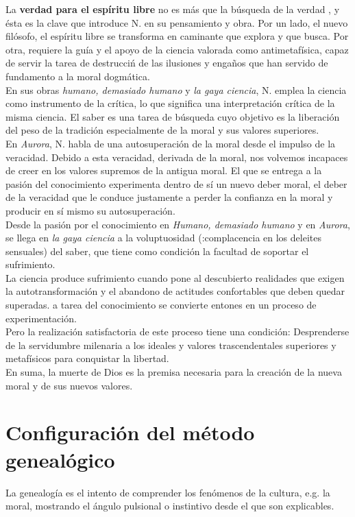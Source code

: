 \documentclass[a4paper, 10pt, twocolumn, spanish]{article}
\begin{document}
La \textbf{verdad para el espíritu libre} no es más que la búsqueda de la
verdad , y ésta es la clave que introduce N. en su pensamiento y
obra. Por un lado, el nuevo filósofo, el espíritu libre se transforma
en caminante que explora y que busca. Por otra, requiere la guía y el
apoyo de la ciencia valorada como antimetafísica, capaz de servir la
tarea de destrucciń de las ilusiones y engaños que han servido de
fundamento a la moral dogmática.\\[0pt]

En sus obras \emph{humano, demasiado humano} y \emph{la gaya ciencia}, N. emplea
la ciencia como instrumento de la crítica, lo que significa una
interpretación crítica de la misma ciencia. El saber es una tarea de
búsqueda cuyo objetivo es la liberación del peso de la tradición
especialmente de la moral y sus valores superiores.\\[0pt]

En \emph{Aurora}, N. habla de una autosuperación de la moral desde el
impulso de la veracidad. Debido a esta veracidad, derivada de la
moral, nos volvemos incapaces de creer en los valores supremos de la
antigua moral. El que se entrega a la pasión del conocimiento
experimenta dentro de sí un nuevo deber moral, el deber de la
veracidad que le conduce justamente a perder la confianza en la moral
y producir en sí mismo su autosuperación.\\[0pt]

Desde la pasión por el conocimiento en \emph{Humano, demasiado humano} y en
\emph{Aurora}, se llega en \emph{la gaya ciencia} a la voluptuosidad
(:complacencia en los deleites sensuales) del saber, que tiene como
condición la facultad de soportar el sufrimiento.\\[0pt]
La ciencia produce sufrimiento cuando pone al descubierto realidades
que exigen la autotransformación y el abandono de actitudes
confortables que deben quedar superadas. a tarea del conocimiento se
convierte entones en un proceso de experimentación.\\[0pt]
Pero la realización satisfactoria de este proceso tiene una condición:
Desprenderse de la servidumbre milenaria a los ideales y valores
trascendentales superiores y metafísicos para conquistar la libertad.\\[0pt]

En suma, la muerte de Dios es la premisa necesaria para la creación de
la nueva moral y de sus nuevos valores.

\section{Configuración del método genealógico}
\label{sec:org8ce583d}
La genealogía es el intento de comprender los fenómenos de la cultura,
e.g. la moral, mostrando el ángulo pulsional o instintivo desde el que
son explicables.\\[0pt]
\end{document}

